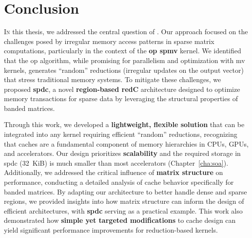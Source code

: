 
\FancyHeadRight{\sectitle}

\renewcommand{\sectitle}{Conclusion}

\chapter*{\sectitle}
\addstarredchapter{\sectitle}


\lettrine{I}{n} this thesis, we addressed the central question of .
Our approach focused on the challenges posed by irregular memory access patterns in sparse matrix computations, particularly in the context of the \textbf{\acrfull{op} \acrfull{spmv}} kernel.
We identified that the \acrshort{op} algorithm, while promising for parallelism and optimization with \acrshort{mv} kernels, generates ``random'' \glspl{reduction} (irregular updates on the output vector) that stress traditional memory systems.
To mitigate these challenges, we proposed \textbf{\acrlong{spdc}}, a novel \textbf{region-based \gls{redC}} architecture designed to optimize memory transactions for sparse data by leveraging the structural properties of \gls{banded} matrices.

Through this work, we developed a \textbf{lightweight, flexible solution} that can be integrated into any kernel requiring efficient ``random'' \glspl{reduction}, recognizing that caches are a fundamental component of memory hierarchies in CPUs, GPUs, and accelerators.
Our design prioritizes \textbf{scalability} and the required storage in \acrlong{spdc} (32~KiB) is much smaller than most accelerators (Chapter~\ref{cha:soa}).
Additionally, we addressed the critical influence of \textbf{matrix structure} on performance, conducting a detailed analysis of cache behavior specifically for \gls{banded} matrices.
By adapting our architecture to better handle dense and sparse regions, we provided insights into how matrix structure can inform the design of efficient architectures, with \textbf{\acrlong{spdc}} serving as a practical example.
This work also demonstrated how \textbf{simple yet targeted modifications} to cache design can yield significant performance improvements for \gls{reduction}-based kernels.

